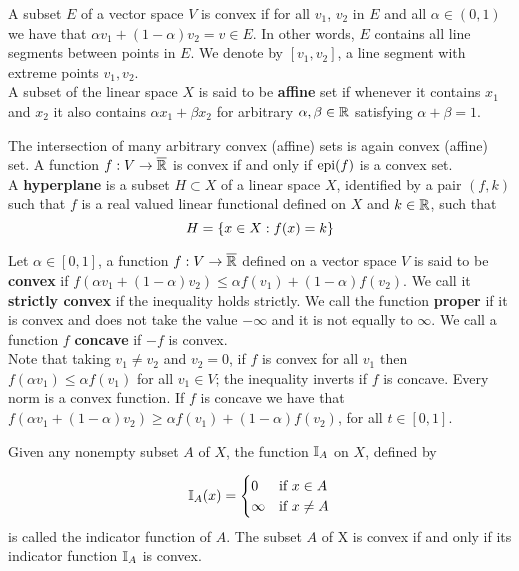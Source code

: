 A subset $E$ of a vector space $V$ is convex if for all $v_1$, $v_2$ in $E$ and all $\alpha \in (0,1)$ we have that $\alpha v_1+(1-\alpha)v_2=v\in E$.
In other words, $E$ contains all line segments between points in $E$. We denote by $[v_1, v_2]$, a line segment with extreme points $v_1, v_2$.\\
A subset of the linear space $X$ is said to be \textbf{affine} set if whenever it contains $x_1$ and $x_2$ it also contains $\alpha x_1+\beta x_2$ for arbitrary $\alpha, \beta \in \mathbb{R}$ satisfying $\alpha+\beta=1$.

The intersection of many arbitrary convex (affine) sets is again convex (affine) set. A function $f: V \rightarrow \overline{\mathbb{R}}$ is convex if and only if $\mathrm{epi}(f)$ is a convex set.\\

A \textbf{hyperplane} is a subset $H\subset X$ of a linear space $X$, identified by a pair $(f, k)$ such that $f$ is a real valued linear functional defined on $X$ and $k\in \mathbb{R}$, such that
\begin{equation}
	H=\left\lbrace x\in X: f(x)=k \right\rbrace
\end{equation}

Let $\alpha\in [0,1]$, a function $f:V\rightarrow \overline{\mathbb{R}}$ defined on a vector space $V$ is said to be \textbf{convex} if $f(\alpha v_1+(1-\alpha)v_2)\leq \alpha f(v_1)+(1-\alpha)f(v_2)$. We call it \textbf{strictly convex} if the inequality holds strictly. We call the function \textbf{proper} if it is convex and does not take the value $-\infty$ and it is not equally to $\infty$. We call a function $f$ \textbf{concave} if $-f$ is convex. \\

Note that taking $v_1\neq v_2$ and $v_2=0$, if $f$ is convex for all $v_1$ then $f(\alpha v_1)\leq \alpha f(v_1)$ for all $v_1\in V$; the inequality inverts if $f$ is concave. Every norm is a convex function. If $f$ is concave we have that $f(\alpha v_1+(1-\alpha)v_2)\geq \alpha f(v_1)+(1-\alpha)f(v_2)$, for all $t\in [0,1]$.

Given any nonempty subset $A$ of $X$, the function $\mathbb{I}_{A}$ on $X$, defined by

\begin{equation*}
\mathbb{I}_{A}(x)=\begin{cases}
	0 & \text{if } x \in A\\
	\infty & \text{if } x \neq A
	\end{cases}
\end{equation*}
is called the indicator function of $A$. The subset $A$ of X is convex if and only if its indicator function $\mathbb{I}_{A}$ is convex.


